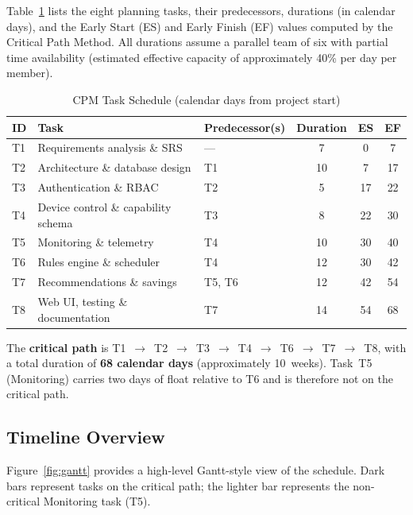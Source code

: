 Table~\ref{tab:cpm} lists the eight planning tasks, their predecessors, durations
(in calendar days), and the Early Start (ES) and Early Finish (EF) values computed
by the Critical Path Method.  All durations assume a parallel team of six with
partial time availability (estimated effective capacity of approximately 40\% per
day per member).

\begin{table}[htbp]
  \caption{CPM Task Schedule (calendar days from project start)}
  \label{tab:cpm}
  \centering
  \begin{tabularx}{\linewidth}{l X l c c c}
    \toprule
    \textbf{ID} & \textbf{Task} & \textbf{Predecessor(s)} & \textbf{Duration} & \textbf{ES} & \textbf{EF} \\
    \midrule
    T1 & Requirements analysis \& SRS        & ---         &  7 &  0 &  7 \\
    T2 & Architecture \& database design     & T1          & 10 &  7 & 17 \\
    T3 & Authentication \& RBAC              & T2          &  5 & 17 & 22 \\
    T4 & Device control \& capability schema & T3          &  8 & 22 & 30 \\
    T5 & Monitoring \& telemetry             & T4          & 10 & 30 & 40 \\
    T6 & Rules engine \& scheduler           & T4          & 12 & 30 & 42 \\
    T7 & Recommendations \& savings          & T5, T6      & 12 & 42 & 54 \\
    T8 & Web UI, testing \& documentation    & T7          & 14 & 54 & 68 \\
    \bottomrule
  \end{tabularx}
\end{table}

\noindent
The \textbf{critical path} is
T1~$\to$~T2~$\to$~T3~$\to$~T4~$\to$~T6~$\to$~T7~$\to$~T8,
with a total duration of \textbf{68 calendar days} (approximately 10~weeks).
Task~T5 (Monitoring) carries two days of float relative to T6 and is therefore
not on the critical path.

\subsection{Timeline Overview}

Figure~\ref{fig:gantt} provides a high-level Gantt-style view of the schedule.
Dark bars represent tasks on the critical path; the lighter bar represents the
non-critical Monitoring task (T5).


